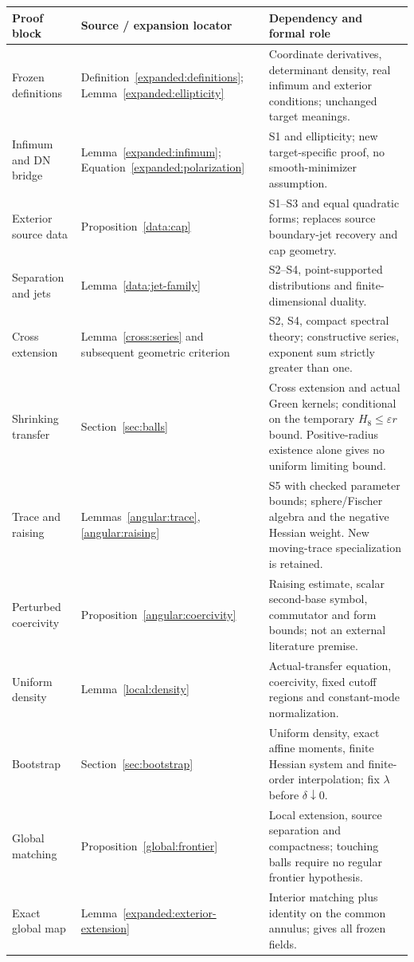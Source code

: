 \documentclass[11pt]{article}
\theoremstyle{definition}
\theoremstyle{remark}
\numberwithin{equation}{section}
\begin{document}
\begin{longtable}{p{}p{}p{}}
\toprule
Proof block & Source / expansion locator & Dependency and formal role\\
\midrule\endhead
Frozen definitions & Definition~\ref{expanded:definitions};
Lemma~\ref{expanded:ellipticity} & Coordinate derivatives, determinant
density, real infimum and exterior conditions; unchanged target meanings.\\
Infimum and DN bridge & Lemma~\ref{expanded:infimum};
Equation~\eqref{expanded:polarization} & S1 and ellipticity;
new target-specific proof, no smooth-minimizer assumption.\\
Exterior source data & Proposition~\ref{data:cap} & S1--S3 and equal
quadratic forms; replaces source boundary-jet recovery and cap geometry.\\
Separation and jets & Lemma~\ref{data:jet-family} & S2--S4,
point-supported distributions and finite-dimensional duality.\\
Cross extension & Lemma~\ref{cross:series} and subsequent geometric
criterion & S2, S4, compact spectral theory; constructive series,
exponent sum strictly greater than one.\\
Shrinking transfer & Section~\ref{sec:balls} & Cross extension and
actual Green kernels; conditional on the temporary $H_8\leq\varepsilon r$
bound. Positive-radius existence alone gives no uniform limiting bound.\\
Trace and raising & Lemmas~\ref{angular:trace}, \ref{angular:raising}
& S5 with checked parameter bounds; sphere/Fischer algebra and the
negative Hessian weight. New moving-trace specialization is retained.\\
Perturbed coercivity & Proposition~\ref{angular:coercivity}
& Raising estimate, scalar second-base symbol, commutator and form
bounds; not an external literature premise.\\
Uniform density & Lemma~\ref{local:density} & Actual-transfer equation,
coercivity, fixed cutoff regions and constant-mode normalization.\\
Bootstrap & Section~\ref{sec:bootstrap} & Uniform density, exact affine
moments, finite Hessian system and finite-order interpolation; fix
$\lambda$ before $\delta\downarrow0$.\\
Global matching & Proposition~\ref{global:frontier} & Local extension,
source separation and compactness; touching balls require no regular
frontier hypothesis.\\
Exact global map & Lemma~\ref{expanded:exterior-extension} & Interior
matching plus identity on the common annulus; gives all frozen fields.\\
\bottomrule
\end{longtable}
\end{document}
